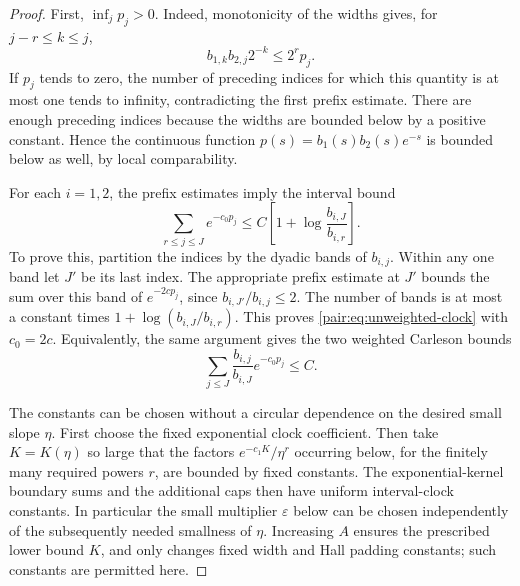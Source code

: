 \documentclass[11pt]{article}
\numberwithin{equation}{section}
\begin{document}
\begin{proof}
First, $\inf_jp_j>0$. Indeed, monotonicity of the widths gives, for
$j-r\le k\le j$,
\[
 b_{1,k}b_{2,j}2^{-k}\le 2^r p_j.
\]
If $p_j$ tends to zero, the number of preceding indices for which this
quantity is at most one tends to infinity, contradicting the first
prefix estimate. There are enough preceding indices because the widths
are bounded below by a positive constant. Hence the continuous function
$p(s)=b_1(s)b_2(s)e^{-s}$ is bounded below as well, by local comparability.

For each $i=1,2$, the prefix estimates imply the interval bound
\begin{equation}\label{pair:eq:unweighted-clock}
 \sum_{r\le j\le J}e^{-c_0p_j}
 \le C\left[1+\log\frac{b_{i,J}}{b_{i,r}}\right].
\end{equation}
To prove this, partition the indices by the dyadic bands of $b_{i,j}$.
Within any one band let $J'$ be its last index. The appropriate prefix
estimate at $J'$ bounds the sum over this band of $e^{-2cp_j}$, since
$b_{i,J'}/b_{i,j}\le2$. The number of bands is at most a constant times
$1+\log(b_{i,J}/b_{i,r})$. This proves
\eqref{pair:eq:unweighted-clock} with $c_0=2c$.
Equivalently, the same argument gives the two weighted Carleson bounds
\[
 \sum_{j\le J}\frac{b_{i,j}}{b_{i,J}}e^{-c_0p_j}\le C.
\]

The constants can be chosen without a circular dependence on the desired
small slope $\eta$. First choose the fixed exponential clock coefficient.
Then take $K=K(\eta)$ so large that the factors
$e^{-c_1K}/\eta^r$ occurring below, for the finitely many required powers
$r$, are bounded by fixed constants. The exponential-kernel boundary
sums and the additional caps then have uniform interval-clock constants.
In particular the small multiplier $\varepsilon$ below can be chosen
independently of the subsequently needed smallness of $\eta$. Increasing
$A$ ensures the prescribed lower bound $K$, and only changes fixed width
and Hall padding constants; such constants are permitted here.


\end{proof}
\end{document}
